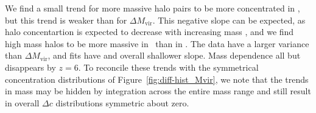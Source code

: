 We find a small trend for more massive halo pairs to be more concentrated in \za, but this trend is weaker than for $\Delta M_{\mathrm{vir}}$.  This negative slope can be expected, as halo concentartion is expected to decrease with increasing mass \citep{2001MNRAS.321..559B}, and we find high mass halos to be more massive in \lpt\ than in \za.  The data have a larger variance than $\Delta M_{\mathrm{vir}}$, and fits have and overall shallower slope.  Mass dependence all but disappears by $z = 6$.  To reconcile these trends with the symmetrical concentration distributions of Figure~\ref{fig:diff-hist_Mvir}, we note that the trends in mass may be hidden by integration across the entire mass range and still result in overall $\Delta c$ distributions symmetric about zero.

